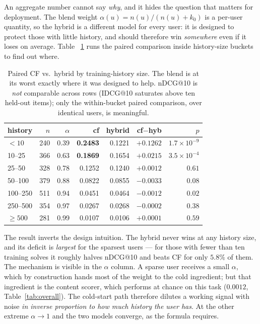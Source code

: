 \documentclass[12pt,a4paper]{article}
\newcommand{\ndcg}{nDCG}
\begin{document}
An aggregate number cannot say \emph{why}, and it hides the question that matters for
deployment. The blend weight $\alpha(u)=n(u)/(n(u)+k_0)$ is a per-user quantity, so the
hybrid is a different model for every user: it is designed to protect those with little
history, and should therefore win \emph{somewhere} even if it loses on average. Table~
\ref{tab:hybridbuckets} runs the paired comparison inside history-size buckets to find
out where.

\begin{table}[h]
\centering
\caption{Paired CF vs.\ hybrid by training-history size. The blend is at its worst
exactly where it was designed to help. \ndcg{}@10 is \emph{not} comparable across rows
(IDCG@10 saturates above ten held-out items); only the within-bucket paired comparison,
over identical users, is meaningful.}
\label{tab:hybridbuckets}
\small
\begin{tabular}{lrrrrrr}
\toprule
history & $n$ & $\alpha$ & cf & hybrid & cf$-$hyb & $p$ \\
\midrule
$<10$     & 240 & 0.39 & \textbf{0.2483} & 0.1221 & $+0.1262$ & $1.7\times10^{-9}$ \\
10--25    & 366 & 0.63 & \textbf{0.1869} & 0.1654 & $+0.0215$ & $3.5\times10^{-4}$ \\
25--50    & 328 & 0.78 & 0.1252 & 0.1240 & $+0.0012$ & $0.61$ \\
50--100   & 379 & 0.88 & 0.0822 & 0.0855 & $-0.0033$ & $0.08$ \\
100--250  & 511 & 0.94 & 0.0451 & 0.0464 & $-0.0012$ & $0.02$ \\
250--500  & 354 & 0.97 & 0.0267 & 0.0268 & $-0.0002$ & $0.38$ \\
$\geq500$ & 281 & 0.99 & 0.0107 & 0.0106 & $+0.0001$ & $0.59$ \\
\bottomrule
\end{tabular}
\end{table}

The result inverts the design intuition. The hybrid never wins at any history size, and
its deficit is \emph{largest} for the sparsest users --- for those with fewer than ten
training solves it roughly halves \ndcg{}@10 and beats CF for only $5.8\%$ of them. The
mechanism is visible in the $\alpha$ column. A sparse user receives a small $\alpha$,
which by construction hands most of the weight to the cold ingredient; but that
ingredient is the content scorer, which performs at chance on this task
($0.0012$, Table~\ref{tab:overall}). The cold-start path therefore dilutes a working
signal with noise \emph{in inverse proportion to how much history the user has}. At the
other extreme $\alpha \to 1$ and the two models converge, as the formula requires.
\end{document}
